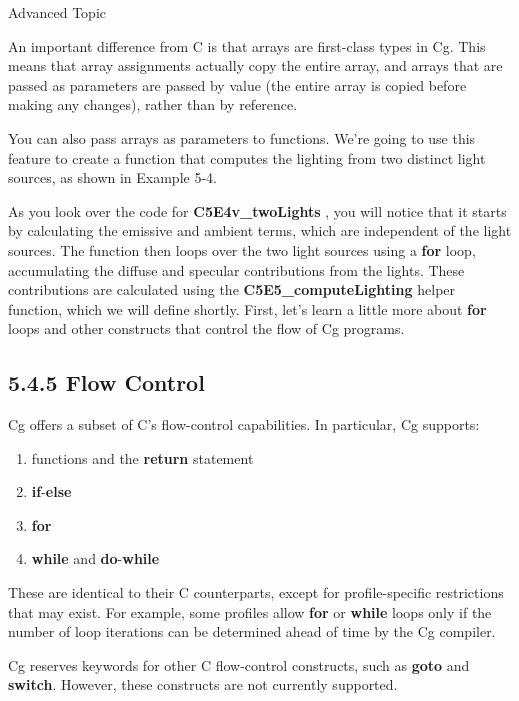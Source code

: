 \documentclass[../main.tex]{subfiles}
\begin{document}
\begin{framed}
Advanced Topic

An important difference from C is that arrays are first-class types in Cg. This means that array assignments actually copy the entire array, and arrays that are passed as parameters are passed by value (the entire array is copied before making any changes), rather than by reference.
\end{framed}

You can also pass arrays as parameters to functions. We're going to use this feature to create a function that computes the lighting from two distinct light sources, as shown in Example 5-4.

As you look over the code for \textbf{C5E4v_twoLights} , you will notice that it starts by calculating the emissive and ambient terms, which are independent of the light sources. The function then loops over the two light sources using a \textbf{for} loop, accumulating the diffuse and specular contributions from the lights. These contributions are calculated using the \textbf{C5E5_computeLighting} helper function, which we will define shortly. First, let's learn a little more about \textbf{for} loops and other constructs that control the flow of Cg programs.

\subsection{5.4.5 Flow Control}

Cg offers a subset of C's flow-control capabilities. In particular, Cg supports:

\begin{enumerate}
\item functions and the \textbf{return} statement
\item \textbf{if}-\textbf{else}
\item \textbf{for}
\item \textbf{while} and \textbf{do}-\textbf{while}
\end{enumerate}

These are identical to their C counterparts, except for profile-specific restrictions that may exist. For example, some profiles allow \textbf{for} or \textbf{while} loops only if the number of loop iterations can be determined ahead of time by the Cg compiler.

Cg reserves keywords for other C flow-control constructs, such as \textbf{goto} and \textbf{switch}. However, these constructs are not currently supported.
\end{document}
